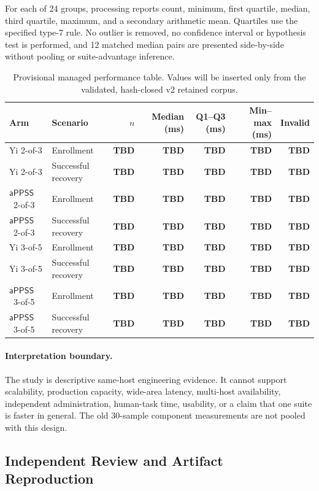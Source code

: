 \documentclass[sigconf,anonymous]{acmart}
\newcommand{\APPSS}{\ensuremath{\mathsf{aPPSS}}}
\newcommand{\TBD}{\textbf{TBD}}
\begin{document}
For each of 24 groups, processing reports count, minimum, first quartile,
median, third quartile, maximum, and a secondary arithmetic mean. Quartiles use
the specified type-7 rule. No outlier is removed, no confidence interval or
hypothesis test is performed, and 12 matched median pairs are presented
side-by-side without pooling or suite-advantage inference.

\begin{table}[t]
\centering
\caption{Provisional managed performance table. Values will be inserted only
from the validated, hash-closed v2 retained corpus.}
\label{tab:performance}
\footnotesize
\begin{tabular}{llrrrrr}
\toprule
\textbf{Arm} & \textbf{Scenario} & \textbf{\(n\)} &
\textbf{Median (ms)} & \textbf{Q1--Q3 (ms)} &
\textbf{Min--max (ms)} & \textbf{Invalid} \\
\midrule
Yi 2-of-3 & Enrollment & \TBD & \TBD & \TBD & \TBD & \TBD \\
Yi 2-of-3 & Successful recovery & \TBD & \TBD & \TBD & \TBD & \TBD \\
\APPSS\ 2-of-3 & Enrollment & \TBD & \TBD & \TBD & \TBD & \TBD \\
\APPSS\ 2-of-3 & Successful recovery & \TBD & \TBD & \TBD & \TBD & \TBD \\
Yi 3-of-5 & Enrollment & \TBD & \TBD & \TBD & \TBD & \TBD \\
Yi 3-of-5 & Successful recovery & \TBD & \TBD & \TBD & \TBD & \TBD \\
\APPSS\ 3-of-5 & Enrollment & \TBD & \TBD & \TBD & \TBD & \TBD \\
\APPSS\ 3-of-5 & Successful recovery & \TBD & \TBD & \TBD & \TBD & \TBD \\
\bottomrule
\end{tabular}
\end{table}

\paragraph{Interpretation boundary.}
The study is descriptive same-host engineering evidence. It cannot support
scalability, production capacity, wide-area latency, multi-host availability,
independent administration, human-task time, usability, or a claim that one
suite is faster in general. The old 30-sample component measurements are not
pooled with this design.

\subsection{Independent Review and Artifact Reproduction}
\end{document}
